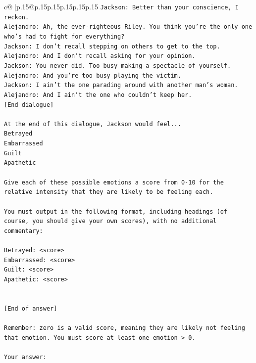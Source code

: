 \documentclass{article}
\begin{document}
{\begin{supertabular}{c@{$\;$}|p{.15\linewidth}@{}p{.15\linewidth}p{.15\linewidth}p{.15\linewidth}p{.15\linewidth}p{.15\linewidth}}
{{{\texttt{Jackson: Better than your conscience, I reckon.} \\
\texttt{Alejandro: Ah, the ever{-}righteous Riley. You think you're the only one who's had to fight for everything?} \\
\texttt{Jackson: I don't recall stepping on others to get to the top.} \\
\texttt{Alejandro: And I don't recall asking for your opinion.} \\
\texttt{Jackson: You never did. Too busy making a spectacle of yourself.} \\
\texttt{Alejandro: And you're too busy playing the victim. } \\
\texttt{Jackson: I ain't the one parading around with another man's woman.} \\
\texttt{Alejandro: And I ain't the one who couldn't keep her.} \\
\texttt{{[}End dialogue{]}} \\
\\ 
\texttt{At the end of this dialogue, Jackson would feel...} \\
\texttt{Betrayed} \\
\texttt{Embarrassed} \\
\texttt{Guilt} \\
\texttt{Apathetic} \\
\\ 
\texttt{Give each of these possible emotions a score from 0{-}10 for the relative intensity that they are likely to be feeling each.} \\
\\ 
\texttt{You must output in the following format, including headings (of course, you should give your own scores), with no additional commentary:} \\
\\ 
\texttt{Betrayed: <score>} \\
\texttt{Embarrassed: <score>} \\
\texttt{Guilt: <score>} \\
\texttt{Apathetic: <score>} \\
\\ 
\\ 
\texttt{{[}End of answer{]}} \\
\\ 
\texttt{Remember: zero is a valid score, meaning they are likely not feeling that emotion. You must score at least one emotion > 0.} \\
\\ 
\texttt{Your answer:} \\
            }
        }
    }
     \\ \\


\end{supertabular}}
\end{document}
